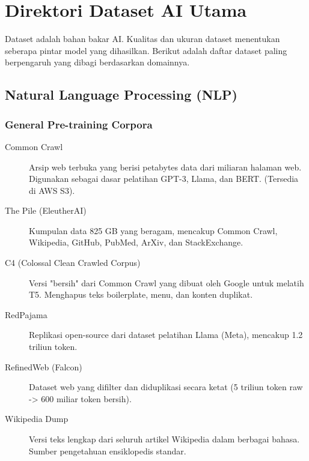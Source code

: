 \chapter{Direktori Dataset AI Utama}
\label{chap:datasets}

Dataset adalah bahan bakar AI. Kualitas dan ukuran dataset menentukan seberapa pintar model yang dihasilkan. Berikut adalah daftar dataset paling berpengaruh yang dibagi berdasarkan domainnya.

\section{Natural Language Processing (NLP)}

\subsection{General Pre-training Corpora}
\begin{description}
    \item[Common Crawl] Arsip web terbuka yang berisi petabytes data dari miliaran halaman web. Digunakan sebagai dasar pelatihan GPT-3, Llama, dan BERT. (Tersedia di AWS S3).
    \item[The Pile (EleutherAI)] Kumpulan data 825 GB yang beragam, mencakup Common Crawl, Wikipedia, GitHub, PubMed, ArXiv, dan StackExchange.
    \item[C4 (Colossal Clean Crawled Corpus)] Versi "bersih" dari Common Crawl yang dibuat oleh Google untuk melatih T5. Menghapus teks boilerplate, menu, dan konten duplikat.
    \item[RedPajama] Replikasi open-source dari dataset pelatihan Llama (Meta), mencakup 1.2 triliun token.
    \item[RefinedWeb (Falcon)] Dataset web yang difilter dan diduplikasi secara ketat (5 triliun token raw -> 600 miliar token bersih).
    \item[Wikipedia Dump] Versi teks lengkap dari seluruh artikel Wikipedia dalam berbagai bahasa. Sumber pengetahuan ensiklopedis standar.
\end{description}

